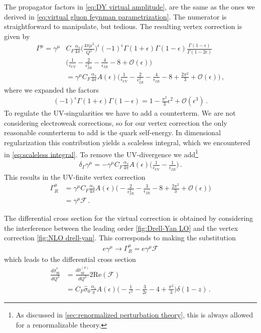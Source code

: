 The propagator factors in \cref{eq:DY virtual amplitude}, are the same as the ones we derived in \cref{eq:virtual gluon feynman parametrization}. The numerator is straightforward to manipulate, but tedious. The resulting vertex correction is given by
\begin{align}
    \Gamma^{\mu}=\gamma^{\mu}&C_{F}\frac{\alpha_s}{4\pi}\Big(\frac{4\pi\mu^{2}}{Q^{2}}\Big)^{\epsilon}(-1)^{\epsilon}\Gamma(1+\epsilon)\Gamma(1-\epsilon)\frac{\Gamma(1-\epsilon)}{\Gamma(1-2\epsilon)}\nonumber
    \\
    &\Big(\frac{1}{\epsilon_{UV}}-\frac{2}{\epsilon_{IR}^{2}}-\frac{4}{\epsilon_{IR}}-8+\mathcal{O}(\epsilon)\Big)\nonumber
    \\
    &=\gamma^{\mu}C_{F}\frac{\alpha_s}{4\pi}A(\epsilon)\Big(\frac{1}{\epsilon_{UV}}-\frac{2}{\epsilon_{IR}^{2}}-\frac{4}{\epsilon_{IR}}-8+\frac{2\pi^{2}}{3}+\mathcal{O}(\epsilon)\Big)\,,
\end{align}
where we expanded the factors
\begin{align}
    (-1)^{\epsilon}\Gamma(1+\epsilon)\Gamma(1-\epsilon)=1-\frac{\pi^{2}}{3}\epsilon^{2}+\mathcal{O}(\epsilon^{3})\,.
\end{align}
To regulate the UV-singularities we have to add a counterterm. We are not considering electroweak corrections, so for our vertex correction the only reasonable counterterm to add is the quark self-energy. In dimensional regularization this contribution yields a scaleless integral, which we encountered in \cref{eq:scaleless integral}. To remove the UV-divergence we add\footnote{As discussed in \cref{sec:renormalized perturbation theory}, this is always allowed for a renormalizable theory.}
\begin{align}
    \delta_{\Gamma}\gamma^{\mu}=-\gamma^{\mu}C_{F}\frac{\alpha_s}{4\pi}A(\epsilon)\Bigg(\frac{1}{\epsilon_{UV}}-\frac{1}{\epsilon_{IR}}\Bigg)\,.
\end{align}
This results in the UV-finite vertex correction
\begin{align}\label{eq:UV-finite vertex}
    \Gamma_{R}^{\mu}&=\gamma^{\mu}C_{F}\frac{\alpha_s}{4\pi}A(\epsilon)\Big(-\frac{2}{\epsilon_{IR}^{2}}-\frac{3}{\epsilon_{IR}}-8+\frac{2\pi^{2}}{3}+\mathcal{O}(\epsilon)\Big)\nonumber
    \\
    &=\gamma^{\mu}\mathcal{F}\,.
\end{align}

The differential cross section for the virtual correction is obtained by considering the interference between the leading order \cref{fig:Drell-Yan LO} and the vertex correction \cref{fig:NLO drell-yan}. This corresponds to making the substitution 
\begin{align}
    e\gamma^{\mu}\rightarrow\Gamma^{\mu}_{R}=e\gamma^{\mu}\mathcal{F}
\end{align}
which leads to the differential cross section
\begin{align}
    \frac{d\hat{\sigma}_{q\bar{q}}^{v}}{dQ^{2}}&=\frac{d\hat{\sigma}_{q\bar{q}}^{(0)}}{dQ^{2}}2\text{Re}(\mathcal{F})
    \\
    &=C_{F}\hat{\sigma}_{0}\frac{\alpha_s}{\pi}A(\epsilon)\Big(-\frac{1}{\epsilon^{2}}-\frac{3}{2\epsilon}-4+\frac{\pi^{2}}{3}\Big)\delta(1-z)\,.
\end{align}

